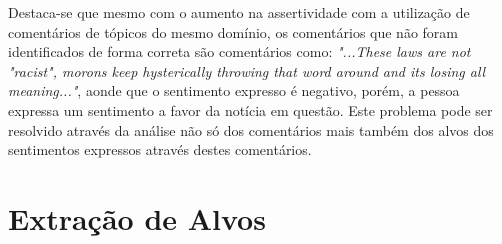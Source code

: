 Destaca-se que mesmo com o aumento na assertividade com a utilização de
comentários de tópicos do mesmo domínio, os comentários que não foram
identificados de forma correta são comentários como: \textit{"...These
laws are not "racist", morons keep hysterically throwing that word around and
its losing all meaning..."}, aonde que o sentimento expresso é negativo, porém,
a pessoa expressa um sentimento a favor da notícia em questão. Este problema
pode ser resolvido através da análise não só dos comentários mais também dos
alvos dos sentimentos expressos através destes comentários.
 
\section{Extração de Alvos}

